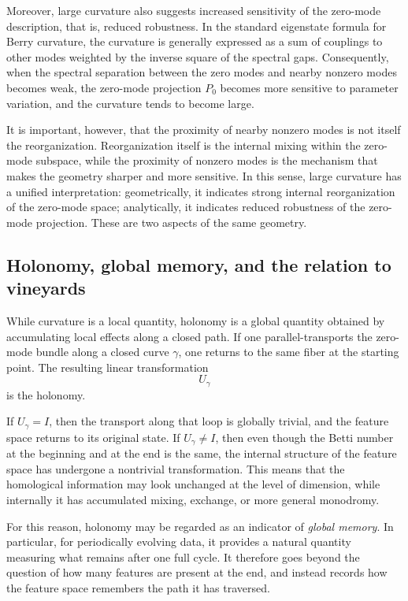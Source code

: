 \documentclass[pdflatex,sn-mathphys-num]{sn-jnl}%
\theoremstyle{thmstyleone}%
\theoremstyle{thmstyletwo}%
\theoremstyle{thmstylethree}%
\begin{document}
Moreover, large curvature also suggests increased sensitivity of the zero-mode description, that is, reduced robustness. In the standard eigenstate formula for Berry curvature, the curvature is generally expressed as a sum of couplings to other modes weighted by the inverse square of the spectral gaps. Consequently, when the spectral separation between the zero modes and nearby nonzero modes becomes weak, the zero-mode projection \(P_0\) becomes more sensitive to parameter variation, and the curvature tends to become large.

It is important, however, that the proximity of nearby nonzero modes is not itself the reorganization. Reorganization itself is the internal mixing within the zero-mode subspace, while the proximity of nonzero modes is the mechanism that makes the geometry sharper and more sensitive. In this sense, large curvature has a unified interpretation: geometrically, it indicates strong internal reorganization of the zero-mode space; analytically, it indicates reduced robustness of the zero-mode projection. These are two aspects of the same geometry.

\subsection{Holonomy, global memory, and the relation to vineyards}

While curvature is a local quantity, holonomy is a global quantity obtained by accumulating local effects along a closed path. If one parallel-transports the zero-mode bundle along a closed curve \(\gamma\), one returns to the same fiber at the starting point. The resulting linear transformation
\[
U_\gamma
\]
is the holonomy.

If \(U_\gamma=I\), then the transport along that loop is globally trivial, and the feature space returns to its original state. If \(U_\gamma\neq I\), then even though the Betti number at the beginning and at the end is the same, the internal structure of the feature space has undergone a nontrivial transformation. This means that the homological information may look unchanged at the level of dimension, while internally it has accumulated mixing, exchange, or more general monodromy.

For this reason, holonomy may be regarded as an indicator of \emph{global memory}. In particular, for periodically evolving data, it provides a natural quantity measuring what remains after one full cycle. It therefore goes beyond the question of how many features are present at the end, and instead records how the feature space remembers the path it has traversed.
\end{document}
